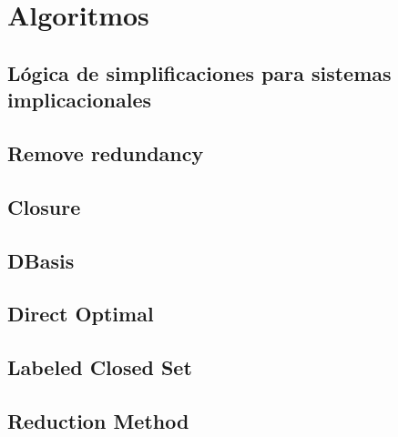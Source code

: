 \section{Algoritmos}

\subsection{L\'ogica de simplificaciones para sistemas implicacionales}

 
\newpage

\subsection{Remove redundancy}

 
\newpage

\subsection{Closure}

 
\newpage

\subsection{DBasis}

 
\newpage

\subsection{Direct Optimal}

 
\newpage

\subsection{Labeled Closed Set}

 
\newpage

\subsection{Reduction Method}

 

\newpage
\thispagestyle{empty}
\mbox{}

\newpage